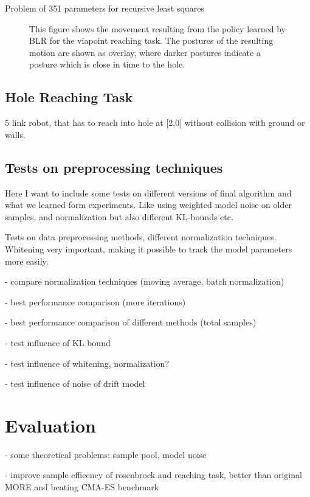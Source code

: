 Problem of 351 parameters for recursive least squares

\begin{figure}[ht!]
  \centering
     
     \hspace{1cm}                       
     \caption{This figure shows the movement resulting from the policy
       learned by BLR for the viapoint reaching task.
       The postures of the resulting motion are shown as overlay,
       where darker postures indicate a posture which
       is close in time to the hole.}
     \label{fig:blr_via}  
\end{figure}

\subsection{Hole Reaching Task}
5 link robot, that has to reach into hole at [2,0] without collision
with ground or walls.

\subsection{Tests on preprocessing techniques}
Here I want to include some tests on different versions
of final algorithm and what we learned form experiments.
Like using weighted model noise on older samples, and
normalization but also different KL-bounds etc.


Tests on data preprocessing methods, different normalization techniques.
Whitening very important, making it possible to track the model parameters
more easily.

- compare normalization techniques (moving average, batch normalization)

- best performance comparison (more iterations)

- best performance comparison of different methods (total samples)

- test influence of KL bound

- test influence of whitening, normalization?

- test influence of noise of drift model

\section{Evaluation}
- some theoretical problems: sample pool, model noise

- improve sample efficency of rosenbrock and reaching task,
better than original MORE and beating CMA-ES benchmark

